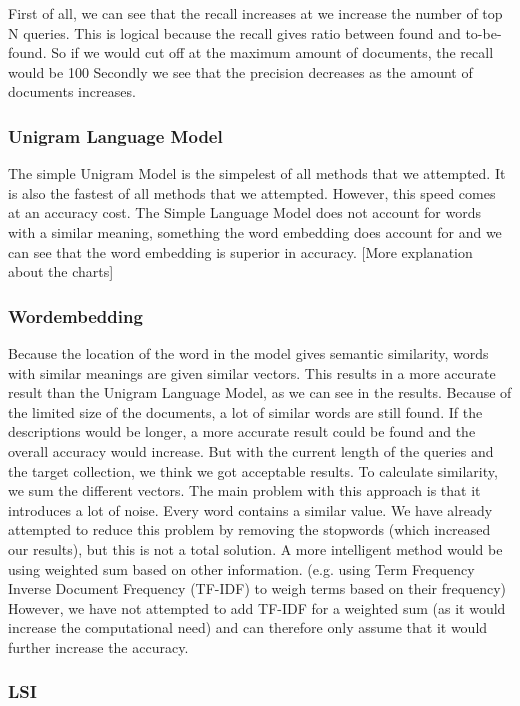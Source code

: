 First of all, we can see that the recall increases at we increase the number of top N queries. This is logical because the recall gives ratio between found and to-be-found. So if we would cut off at the maximum amount of documents, the recall would be 100%
\newline
Secondly we see that the precision decreases as the amount of documents increases. 

\subsubsection{Unigram Language Model}
The simple Unigram Model is the simpelest of all methods that we attempted. It is also the fastest of all methods that we attempted. However, this speed comes at an accuracy cost.
The Simple Language Model does not account for words with a similar meaning, something the word embedding does account for and we can see that the word embedding is superior in accuracy.
[More explanation about the charts]

\subsubsection{Wordembedding}
Because the location of the word in the model gives semantic similarity, words with similar meanings are given similar vectors. This results in a more accurate result than the Unigram Language Model, as we can see in the results.
Because of the limited size of the documents, a lot of similar words are still found. If the descriptions would be longer, a more accurate result could be found and the overall accuracy would increase. But with the current length of the queries and the target collection, we think we got acceptable results.
\newline
\newline
To calculate similarity, we sum the different vectors. The main problem with this approach is that it introduces a lot of noise. Every word contains a similar value. We have already attempted to reduce this problem by removing the stopwords (which increased our results), but this is not a total solution. A more intelligent method would be using weighted sum based on other information. (e.g. using Term Frequency Inverse Document Frequency (TF-IDF) to weigh terms based on their frequency) However, we have not attempted to add TF-IDF for a weighted sum (as it would increase the computational need) and can therefore only assume that it would further increase the accuracy.

\subsubsection{LSI}
